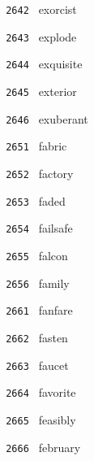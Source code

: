 \documentclass[11pt]{article}
\begin{document}
\begin{multicols}{6}
\noindent \texttt{ 2642 } \hspace{1mm} exorcist  \par
\noindent \texttt{ 2643 } \hspace{1mm} explode  \par
\noindent \texttt{ 2644 } \hspace{1mm} exquisite  \par
\noindent \texttt{ 2645 } \hspace{1mm} exterior  \par
\noindent \texttt{ 2646 } \hspace{1mm} exuberant  \par
\noindent \texttt{ 2651 } \hspace{1mm} fabric  \par
\noindent \texttt{ 2652 } \hspace{1mm} factory  \par
\noindent \texttt{ 2653 } \hspace{1mm} faded  \par
\noindent \texttt{ 2654 } \hspace{1mm} failsafe  \par
\noindent \texttt{ 2655 } \hspace{1mm} falcon  \par
\noindent \texttt{ 2656 } \hspace{1mm} family  \par
\noindent \texttt{ 2661 } \hspace{1mm} fanfare  \par
\noindent \texttt{ 2662 } \hspace{1mm} fasten  \par
\noindent \texttt{ 2663 } \hspace{1mm} faucet  \par
\noindent \texttt{ 2664 } \hspace{1mm} favorite  \par
\noindent \texttt{ 2665 } \hspace{1mm} feasibly  \par
\noindent \texttt{ 2666 } \hspace{1mm} february  \par
\end{multicols}
\end{document}
